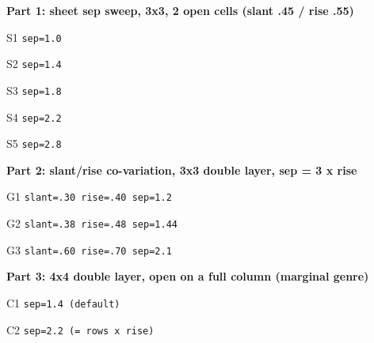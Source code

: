 \documentclass[varwidth=22cm, border=6pt]{standalone}
\begin{document}
\textbf{Part 1: sheet sep sweep, 3x3, 2 open cells (slant .45 / rise .55)}

\medskip
S1 \texttt{sep=1.0}\quad
\begin{tenkzplanes}[rows=3, cols=3, sheet sep=1.0, open={(1,2),(3,3)}]
\end{tenkzplanes}
\qquad
S2 \texttt{sep=1.4}\quad
\begin{tenkzplanes}[rows=3, cols=3, sheet sep=1.4, open={(1,2),(3,3)}]
\end{tenkzplanes}
\qquad
S3 \texttt{sep=1.8}\quad
\begin{tenkzplanes}[rows=3, cols=3, sheet sep=1.8, open={(1,2),(3,3)}]
\end{tenkzplanes}

\medskip
S4 \texttt{sep=2.2}\quad
\begin{tenkzplanes}[rows=3, cols=3, sheet sep=2.2, open={(1,2),(3,3)}]
\end{tenkzplanes}
\qquad
S5 \texttt{sep=2.8}\quad
\begin{tenkzplanes}[rows=3, cols=3, sheet sep=2.8, open={(1,2),(3,3)}]
\end{tenkzplanes}

\bigskip
\textbf{Part 2: slant/rise co-variation, 3x3 double layer, sep = 3 x rise}

\medskip
G1 \texttt{slant=.30 rise=.40 sep=1.2}\quad
\makeatletter
{\def\tenkz@r@planeslant{0.30}\def\tenkz@r@planerise{0.40}%
\begin{tenkzplanes}[rows=3, cols=3, sheet sep=1.2, open={(1,2),(3,3)}]
\end{tenkzplanes}}
\makeatother
\qquad
G2 \texttt{slant=.38 rise=.48 sep=1.44}\quad
\makeatletter
{\def\tenkz@r@planeslant{0.38}\def\tenkz@r@planerise{0.48}%
\begin{tenkzplanes}[rows=3, cols=3, sheet sep=1.44, open={(1,2),(3,3)}]
\end{tenkzplanes}}
\makeatother
\qquad
G3 \texttt{slant=.60 rise=.70 sep=2.1}\quad
\makeatletter
{\def\tenkz@r@planeslant{0.60}\def\tenkz@r@planerise{0.70}%
\begin{tenkzplanes}[rows=3, cols=3, sheet sep=2.1, open={(1,2),(3,3)}]
\end{tenkzplanes}}
\makeatother

\bigskip
\textbf{Part 3: 4x4 double layer, open on a full column (marginal genre)}

\medskip
C1 \texttt{sep=1.4 (default)}\quad
\begin{tenkzplanes}[rows=4, cols=4, sheet sep=1.4, open={(1-4,2)}]
\end{tenkzplanes}
\qquad
C2 \texttt{sep=2.2 (= rows x rise)}\quad
\begin{tenkzplanes}[rows=4, cols=4, sheet sep=2.2, open={(1-4,2)}]
\end{tenkzplanes}
\end{document}
